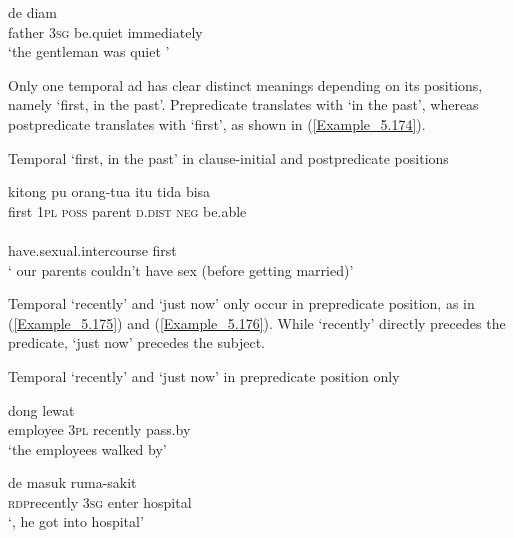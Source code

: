 \ea
\label{Example_5.173}
 {de} {diam} {}\\ %
 father  \textsc{3sg}  be.quiet  immediately\\
\glt 
‘the gentleman was quiet ’ \textstyleExampleSource{[080917-010-CvEx.0191]}
\z


Only one temporal ad has clear distinct meanings depending on its positions, namely  ‘first, in the past’. Prepredicate  translates with ‘in the past’, whereas postpredicate  translates with ‘first’, as shown in (\ref{Example_5.174}).


\begin{styleExampleTitle}
Temporal  ‘first, in the past’ in clause-initial and postpredicate positions
\end{styleExampleTitle}

\ea
\label{Example_5.174}
 {kitong} {pu} {{orang-tua}} {itu} {tida} {bisa}\\ %
 first  \textsc{1pl}  \textsc{poss}  {parent}  \textsc{d.dist}  \textsc{neg}  be.able\\
   {}\\
 {have.sexual.intercourse}  {first}\\
\glt 
‘ our parents couldn’t have sex  (before getting married)’ \textstyleExampleSource{[081110-006-CvEx.0012]}
\z


Temporal  ‘recently’ and  ‘just now’ only occur in prepredic\-ate position, as in (\ref{Example_5.175}) and (\ref{Example_5.176}). While  ‘recently’ directly precedes the predicate,  ‘just now’ precedes the subject.


\begin{styleExampleTitle}
Temporal  ‘recently’ and  ‘just now’ in prepredicate position only
\end{styleExampleTitle}

\ea
\label{Example_5.175}
 {dong} {} {lewat}\\ %
 employee  \textsc{3pl}  recently  pass.by\\
\glt 
‘the employees  walked by’ \textstyleExampleSource{[080922-001a-CvPh.0830]}
\z

\ea
\label{Example_5.176}
 {de} {masuk} {ruma-sakit}\\ %
 \textsc{rdp}{\Tilde}recently  \textsc{3sg}  enter  hospital\\
\glt
‘, he got into hospital’ \textstyleExampleSource{[081115-001a-Cv.0070]}
\z


